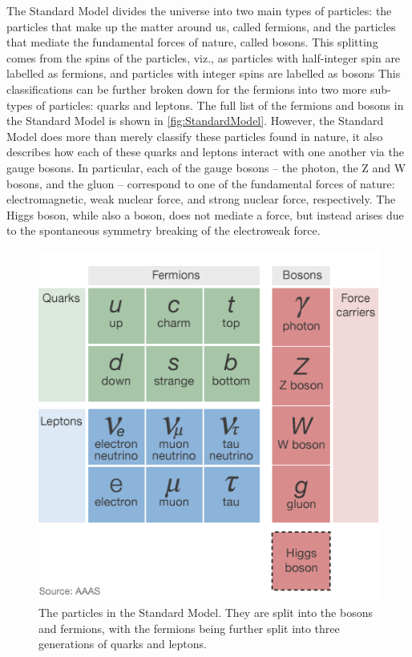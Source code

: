 The Standard Model divides the universe into two main types of particles: the particles that make up the matter around us, called fermions, and the particles that mediate the fundamental forces of nature, called bosons.
This splitting comes from the spins of the particles, viz., as particles with half-integer spin are labelled as fermions, and particles with integer spins are labelled as bosons
This classifications can be further broken down for the fermions into two more sub-types of particles: quarks and leptons.
The full list of the fermions and bosons in the Standard Model is shown in \autoref{fig:StandardModel}.
However, the Standard Model does more than merely classify these particles found in nature, it also describes how each of these quarks and leptons interact with one another via the gauge bosons.
In particular, each of the gauge bosons -- the photon, the Z and W bosons, and the gluon -- correspond to one of the fundamental forces of nature: electromagnetic, weak nuclear force, and strong nuclear force, respectively.
The Higgs boson, while also a boson, does not mediate a force, but instead arises due to the spontaneous symmetry breaking of the electroweak force. 

\begin{figure}[tbph]
\centering
\includegraphics[width=0.6\linewidth]{Figures/higgs-elementary-particles.png}
\caption[The particles in the Standard Model]{The particles in the Standard Model. They are split into the bosons and fermions, with the fermions being further split into three generations of quarks and leptons.}
\label{fig:StandardModel}
\end{figure}


